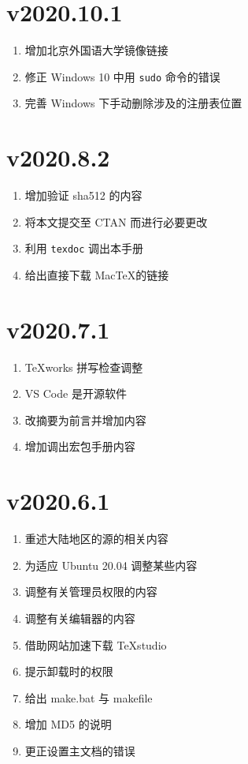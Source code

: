 \section*{v2020.10.1}

\begin{enumerate}
  \item 增加北京外国语大学镜像链接
  \item 修正 Windows 10 中用 \texttt{sudo} 命令的错误
  \item 完善 Windows 下手动删除涉及的注册表位置
\end{enumerate}

\section*{v2020.8.2}

\begin{enumerate}
  \item 增加验证 sha512 的内容
  \item 将本文提交至 CTAN 而进行必要更改
  \item 利用 \texttt{texdoc} 调出本手册
  \item 给出直接下载 Mac\TeX 的链接
\end{enumerate}

\section*{v2020.7.1}

\begin{enumerate}
  \item \TeX works 拼写检查调整
  \item VS Code 是开源软件
  \item 改摘要为前言并增加内容
  \item 增加调出宏包手册内容
\end{enumerate}

\section*{v2020.6.1}

\begin{enumerate}
  \item 重述大陆地区的源的相关内容
  \item 为适应 Ubuntu 20.04 调整某些内容
  \item 调整有关管理员权限的内容
  \item 调整有关编辑器的内容
  \item 借助网站加速下载 TeXstudio
  \item 提示卸载时的权限
  \item 给出 make.bat 与 makefile
  \item 增加 MD5 的说明
  \item 更正设置主文档的错误
\end{enumerate}

